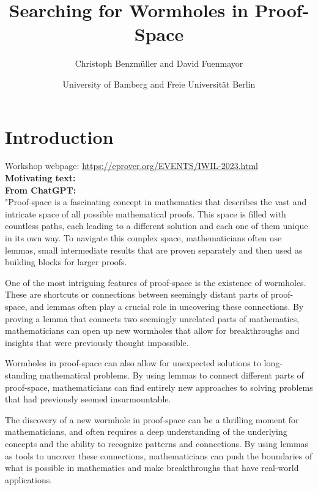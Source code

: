 \documentclass{article}
\title{Searching for Wormholes in Proof-Space}
\author{Christoph Benzmüller and David Fuenmayor}
\date{University of Bamberg and Freie Universität Berlin}
\begin{document}
\maketitle

\section{Introduction}

Workshop webpage: \url{https://eprover.org/EVENTS/IWIL-2023.html}
\\
\textbf{Motivating text:}
\\

\textbf{From ChatGPT:}
\\
"Proof-space is a fascinating concept in mathematics that describes the vast and intricate space of all possible mathematical proofs. This space is filled with countless paths, each leading to a different solution and each one of them unique in its own way. To navigate this complex space, mathematicians often use lemmas, small intermediate results that are proven separately and then used as building blocks for larger proofs.

One of the most intriguing features of proof-space is the existence of wormholes. These are shortcuts or connections between seemingly distant parts of proof-space, and lemmas often play a crucial role in uncovering these connections. By proving a lemma that connects two seemingly unrelated parts of mathematics, mathematicians can open up new wormholes that allow for breakthroughs and insights that were previously thought impossible.

Wormholes in proof-space can also allow for unexpected solutions to long-standing mathematical problems. By using lemmas to connect different parts of proof-space, mathematicians can find entirely new approaches to solving problems that had previously seemed insurmountable.

The discovery of a new wormhole in proof-space can be a thrilling moment for mathematicians, and often requires a deep understanding of the underlying concepts and the ability to recognize patterns and connections. By using lemmas as tools to uncover these connections, mathematicians can push the boundaries of what is possible in mathematics and make breakthroughs that have real-world applications.
\end{document}
